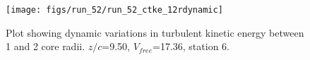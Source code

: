 \begin{figure}[H]
\centering
\texttt{[image: figs/run\_52/run\_52\_ctke\_12rdynamic]}
\caption{Plot showing dynamic variations in turbulent kinetic energy between 1 and 2 core radii. $z/c$=9.50, $V_{free}$=17.36, station 6.}
\end{figure}


